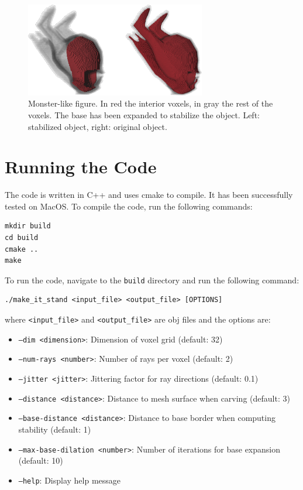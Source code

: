 \documentclass[tikz,10pt,fleqn]{article}
\begin{document}
\begin{figure}[H]
    \centering
    \includegraphics[width=0.7\textwidth]{fig/mrhumpty.png}
    \caption{Monster-like figure. In red the interior voxels, in gray the rest of the voxels. The base has been expanded to stabilize the object. Left: stabilized object, right: original object.}
    \label{fig:monster}
\end{figure}


\section{Running the Code}
The code is written in C++ and uses cmake to compile. It has been successfully tested on MacOS. To compile the code, run the following commands:
\begin{verbatim}
mkdir build
cd build
cmake ..
make
\end{verbatim}

To run the code, navigate to the \texttt{build} directory and run the following command:
\begin{verbatim}
./make_it_stand <input_file> <output_file> [OPTIONS]
\end{verbatim}
where \texttt{<input_file>} and \texttt{<output_file>} are obj files and the options are:
\begin{itemize}
    \item \texttt{--dim <dimension>}: Dimension of voxel grid (default: 32)
    \item \texttt{--num-rays <number>}: Number of rays per voxel (default: 2)
    \item \texttt{--jitter <jitter>}: Jittering factor for ray directions (default: 0.1)
    \item \texttt{--distance <distance>}: Distance to mesh surface when carving (default: 3)
    \item \texttt{--base-distance <distance>}: Distance to base border when computing stability (default: 1)
    \item \texttt{--max-base-dilation <number>}: Number of iterations for base expansion (default: 10)
    \item \texttt{--help}: Display help message
\end{itemize}   







\end{document}
